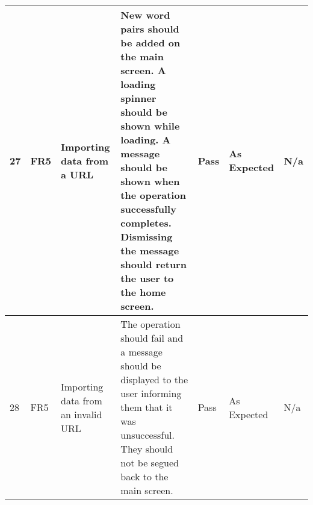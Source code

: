 \documentclass[paper=a4, fontsize=11pt]{scrartcl}	%
\numberwithin{equation}{section}															%
\numberwithin{figure}{section}																%
\numberwithin{table}{section}
\begin{document}
\begin{landscape}
\begin{longtable}{|l|p{2cm}|p{5cm}|p{5cm}|l|p{5cm}|p{5cm}|}
27 & FR5                    & Importing data from a URL                            & New word pairs should be added on the main screen. A loading spinner should be shown while loading. A message should be shown when the operation successfully completes. Dismissing the message should return the user to the home screen. & Pass      & As Expected                                        & N/a                                                                                                                                                                                                                        \\ \hline
28 & FR5                    & Importing data from an invalid URL                   & The operation should fail and a message should be displayed to the user informing them that it was unsuccessful. They should not be segued back to the main screen.                                                                        & Pass      & As Expected                                        & N/a                                                                                                                                                                                                                        \\ \hline
                                                                                                                                                                                                                      
\end{longtable}


\end{landscape}

\clearpage


\end{document}
